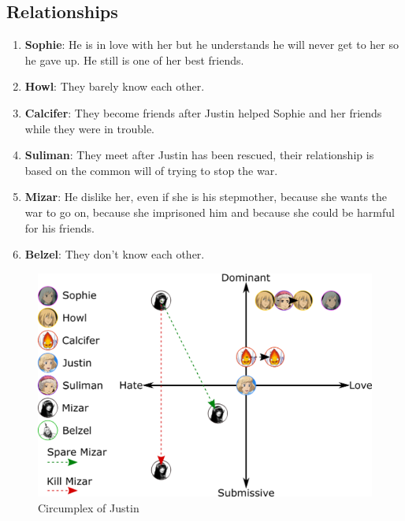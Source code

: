 \subsection{Relationships}
\begin{enumerate}
\item \textbf{Sophie}: He is in love with her but he understands he will never get to her so he gave up. He still is one of her best friends.
\item \textbf{Howl}: They barely know each other.
\item \textbf{Calcifer}: They become friends after Justin helped Sophie and her friends while they were in trouble.
\item \textbf{Suliman}: They meet after Justin has been rescued, their relationship is based on the common will of trying to stop the war.
\item \textbf{Mizar}: He dislike her, even if she is his stepmother, because she wants the war to go on, because she imprisoned him and because she could be harmful for his friends.
\item \textbf{Belzel}: They don't know each other.
\end{enumerate}

\begin{figure}[H]
  \centering
  \includegraphics[width=14cm]{Images/Diagrams/Circumplexes/justinCircumplex}
  \caption{Circumplex of Justin}
\end{figure}

